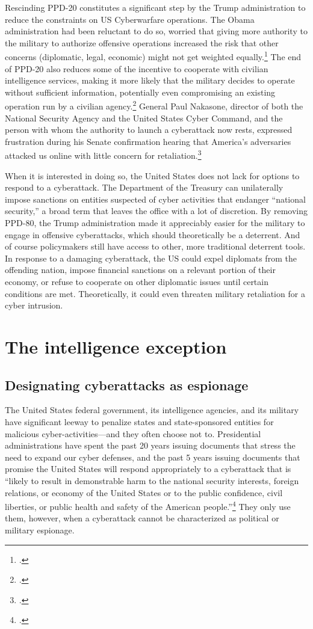 \documentclass{memoir}
\begin{document}
\begin{refsegment}
Rescinding PPD-20 constitutes a significant step by the Trump administration to reduce the constraints on US Cyberwarfare operations. The Obama administration had been reluctant to do so, worried that giving more authority to the military to authorize offensive operations increased the risk that other concerns (diplomatic, legal, economic) might not get weighted equally.\footcite{starks_ramifications_2018} The end of PPD-20 also reduces some of the incentive to cooperate with civilian intelligence services, making it more likely that the military decides to operate without sufficient information, potentially even compromising an existing operation run by a civilian agency.\footcite{hawkins_cybersecurity_2018} General Paul Nakasone, director of both the National Security Agency and the United States Cyber Command, and the person with whom the authority to launch a cyberattack now rests, expressed frustration during his Senate confirmation hearing that America's adversaries attacked us online with little concern for retaliation.\footcite{sanger_trump_2018}

When it is interested in doing so, the United States does not lack for options to respond to a cyberattack. The Department of the Treasury can unilaterally impose sanctions on entities suspected of cyber activities that endanger ``national security,'' a broad term that leaves the office with a lot of discretion. By removing PPD-80, the Trump administration made it appreciably easier for the military to engage in offensive cyberattacks, which should theoretically be a deterrent. And of course policymakers still have access to other, more traditional deterrent tools. In response to a damaging cyberattack, the US could expel diplomats from the offending nation, impose financial sanctions on a relevant portion of their economy, or refuse to cooperate on other diplomatic issues until certain conditions are met. Theoretically, it could even threaten military retaliation for a cyber intrusion.

\section{The intelligence exception}
\subsection{Designating cyberattacks as espionage}
The United States federal government, its intelligence agencies, and its military have significant leeway to penalize states and state-sponsored entities for malicious cyber-activities---and they often choose not to. Presidential administrations have spent the past 20 years issuing documents that stress the need to expand our cyber defenses, and the past 5 years issuing documents that promise the United States will respond appropriately to a cyberattack that is ``likely to result in demonstrable harm to the national security interests, foreign relations, or economy of the United States or to the public confidence, civil liberties, or public health and safety of the American people.''\footcite{office_of_the_press_secretary_fact_2016} They only use them, however, when a cyberattack cannot be characterized as political or military espionage.


\end{refsegment}
\end{document}
